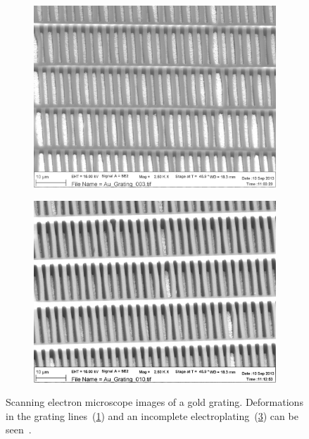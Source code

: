 \begin{figure}[htb]
    \centering
    \begin{subfigure}[b]{.49\textwidth}
    \centering
    \includegraphics[width=\textwidth]{gfx/Au_Grating_003.png}
    \caption{}
    \label{fig:deformazioni}
    \end{subfigure}
    \hfill
    \begin{subfigure}[b]{.49\textwidth}
    \centering
    \includegraphics[width=\textwidth]{gfx/Au_Grating_010.png}
    \caption{}
    \label{fig:galvanizzazione}
    \end{subfigure}
    \caption[Electron microscope images of a gold grating.]{Scanning
        electron microscope images of a gold grating.
        Deformations in the grating lines~(\ref{fig:deformazioni}) and an
        incomplete electroplating~(\ref{fig:galvanizzazione}) can be
        seen~\parencite{galitesina}.
    }
\end{figure}

